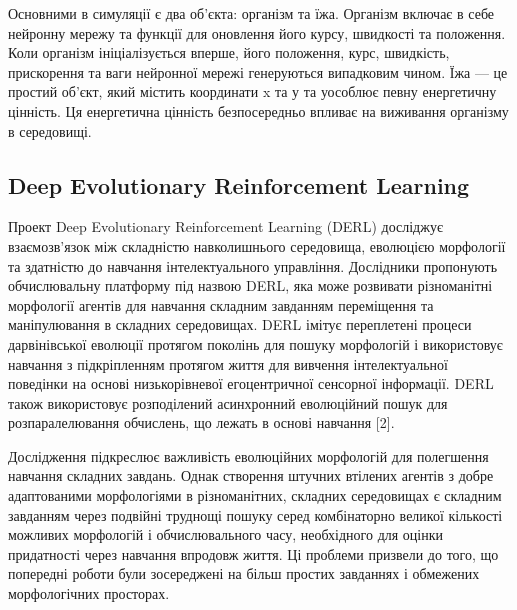 Основними в симуляції є два об'єкта: організм та їжа. 
Організм включає в себе нейронну мережу та функції для оновлення його курсу,
швидкості та положення. 
Коли організм ініціалізується вперше, його положення, курс, швидкість,
прискорення та ваги нейронної мережі генеруються випадковим чином.
Їжа --- це простий об'єкт, який містить координати x та у та уособлює певну 
енергетичну цінність. Ця енергетична цінність безпосередньо впливає на 
виживання організму в середовищі.

\subsection{Deep Evolutionary Reinforcement Learning}

Проект Deep Evolutionary Reinforcement Learning (DERL) досліджує взаємозв'язок 
між складністю навколишнього середовища, еволюцією морфології та здатністю до 
навчання інтелектуального управління. Дослідники пропонують обчислювальну платформу 
під назвою DERL, яка може розвивати різноманітні морфології агентів для 
навчання складним завданням переміщення та маніпулювання в складних середовищах. 
DERL імітує переплетені процеси дарвінівської еволюції протягом поколінь для пошуку 
морфологій і використовує навчання з підкріпленням протягом життя для вивчення 
інтелектуальної поведінки на основі низькорівневої егоцентричної сенсорної інформації.
DERL також використовує розподілений асинхронний еволюційний пошук для 
розпаралелювання обчислень, що лежать в основі навчання [2].

Дослідження підкреслює важливість еволюційних морфологій для полегшення 
навчання складних завдань. 
Однак створення штучних втілених агентів з добре адаптованими морфологіями в
різноманітних, складних середовищах є складним завданням через подвійні труднощі 
пошуку серед комбінаторно великої кількості можливих морфологій і 
обчислювального часу, необхідного для оцінки придатності через навчання впродовж життя.
Ці проблеми призвели до того, що попередні роботи були зосереджені на більш 
простих завданнях і обмежених морфологічних просторах.




